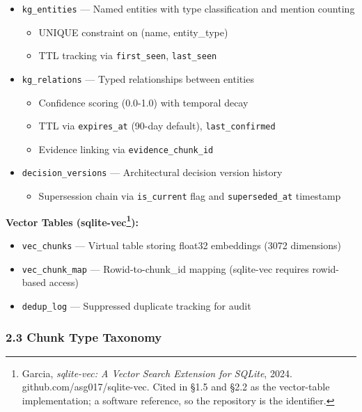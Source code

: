 \documentclass[
]{article}
\providecommand{\tightlist}{%
  \setlength{\itemsep}{0pt}\setlength{\parskip}{0pt}}
\begin{document}
\begin{itemize}
\tightlist
\item
  \texttt{kg\_entities} --- Named entities with type classification and
  mention counting

  \begin{itemize}
  \tightlist
  \item
    UNIQUE constraint on (name, entity\_type)
  \item
    TTL tracking via \texttt{first\_seen}, \texttt{last\_seen}
  \end{itemize}
\item
  \texttt{kg\_relations} --- Typed relationships between entities

  \begin{itemize}
  \tightlist
  \item
    Confidence scoring (0.0-1.0) with temporal decay
  \item
    TTL via \texttt{expires\_at} (90-day default),
    \texttt{last\_confirmed}
  \item
    Evidence linking via \texttt{evidence\_chunk\_id}
  \end{itemize}
\item
  \texttt{decision\_versions} --- Architectural decision version history

  \begin{itemize}
  \tightlist
  \item
    Supersession chain via \texttt{is\_current} flag and
    \texttt{superseded\_at} timestamp
  \end{itemize}
\end{itemize}

\textbf{Vector Tables (sqlite-vec\footnote{Garcia, \emph{sqlite-vec: A
  Vector Search Extension for SQLite}, 2024.
  github.com/asg017/sqlite-vec. Cited in §1.5 and §2.2 as the
  vector-table implementation; a software reference, so the repository
  is the identifier.}):}

\begin{itemize}
\item
  \texttt{vec\_chunks} --- Virtual table storing float32 embeddings
  (3072 dimensions)
\item
  \texttt{vec\_chunk\_map} --- Rowid-to-chunk\_id mapping (sqlite-vec
  requires rowid-based access)
\item
  \texttt{dedup\_log} --- Suppressed duplicate tracking for audit
\end{itemize}

\subsubsection{2.3 Chunk Type Taxonomy}\label{chunk-type-taxonomy}
\end{document}
